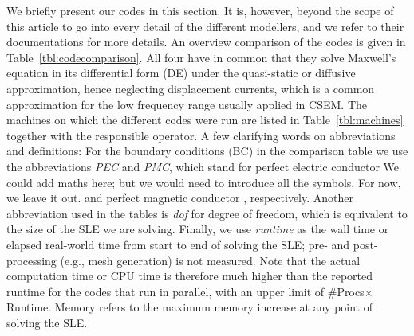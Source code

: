 \documentclass[onecolumn,extra,camera]{gji}
\begin{document}
We briefly present our codes in this section. It is, however, beyond the scope of this article to go into every detail of the different modellers, and we refer to their documentations for more details. An overview comparison of the codes is given in Table~\ref{tbl:codecomparison}. All four have in common that they solve Maxwell's equation in its differential form (DE) under the quasi-static or diffusive approximation, hence neglecting displacement currents, which is a common approximation for the low frequency range usually applied in CSEM. The machines on which the different codes were run are listed in Table~\ref{tbl:machines} together with the responsible operator. A few clarifying words on abbreviations and definitions: For the boundary conditions (BC) in the comparison table we use the abbreviations \emph{PEC} and \emph{PMC}, which stand for perfect electric conductor
We could add maths here; but we would need to introduce all the symbols. For now, we leave it out.
and perfect magnetic conductor%
, respectively. Another abbreviation used in the tables is \emph{dof} for degree of freedom, which is equivalent to the size of the SLE we are solving. Finally, we use \emph{runtime} as the wall time or elapsed real-world time from start to end of solving the SLE; pre- and post-processing (e.g., mesh generation) is not measured. Note that the actual computation time or CPU time is therefore much higher than the reported runtime for the codes that run in parallel, with an upper limit of \#Procs$\times$Runtime. Memory refers to the maximum memory increase at any point of solving the SLE.
\end{document}

